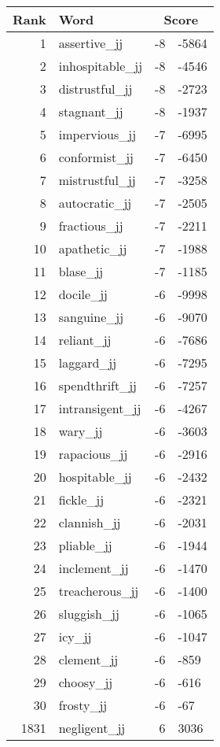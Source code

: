 \begin{longtable}[!htbp]{| rlr@{.}l |}
    \hline
    \textbf{Rank} & \textbf{Word} & \multicolumn{2}{c|}{\textbf{Score}} \\
    \hline
    \endhead
    1 & assertive\_jj & -8 & -5864 \\
    2 & inhospitable\_jj & -8 & -4546 \\
    3 & distrustful\_jj & -8 & -2723 \\
    4 & stagnant\_jj & -8 & -1937 \\
    5 & impervious\_jj & -7 & -6995 \\
    6 & conformist\_jj & -7 & -6450 \\
    7 & mistrustful\_jj & -7 & -3258 \\
    8 & autocratic\_jj & -7 & -2505 \\
    9 & fractious\_jj & -7 & -2211 \\
    10 & apathetic\_jj & -7 & -1988 \\
    11 & blase\_jj & -7 & -1185 \\
    12 & docile\_jj & -6 & -9998 \\
    13 & sanguine\_jj & -6 & -9070 \\
    14 & reliant\_jj & -6 & -7686 \\
    15 & laggard\_jj & -6 & -7295 \\
    16 & spendthrift\_jj & -6 & -7257 \\
    17 & intransigent\_jj & -6 & -4267 \\
    18 & wary\_jj & -6 & -3603 \\
    19 & rapacious\_jj & -6 & -2916 \\
    20 & hospitable\_jj & -6 & -2432 \\
    21 & fickle\_jj & -6 & -2321 \\
    22 & clannish\_jj & -6 & -2031 \\
    23 & pliable\_jj & -6 & -1944 \\
    24 & inclement\_jj & -6 & -1470 \\
    25 & treacherous\_jj & -6 & -1400 \\
    26 & sluggish\_jj & -6 & -1065 \\
    27 & icy\_jj & -6 & -1047 \\
    28 & clement\_jj & -6 & -859 \\
    29 & choosy\_jj & -6 & -616 \\
    30 & frosty\_jj & -6 & -67 \\
    1831 & negligent\_jj & 6 & 3036 \\

\end{longtable}
